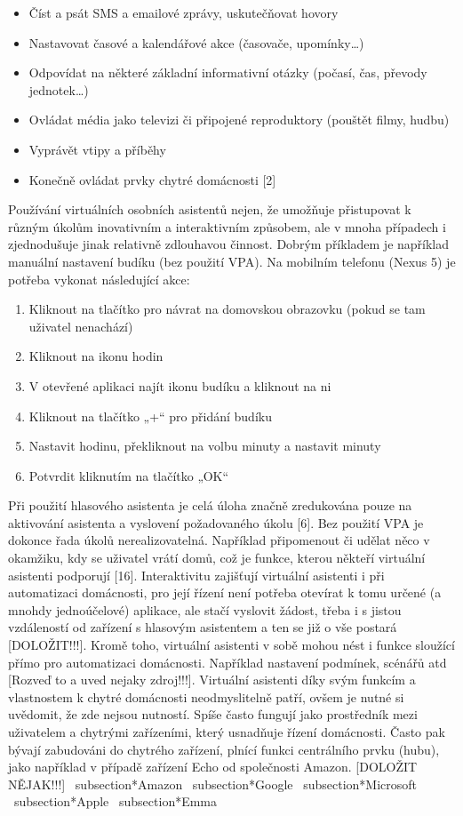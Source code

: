 \begin{itemize}
\item Číst a psát SMS a emailové zprávy, uskutečňovat hovory
\item Nastavovat časové a kalendářové akce (časovače, upomínky…)
\item Odpovídat na některé základní informativní otázky (počasí, čas, převody jednotek…)
\item Ovládat média jako televizi či připojené reproduktory (pouštět filmy, hudbu)
\item Vyprávět vtipy a příběhy
\item Konečně ovládat prvky chytré domácnosti [2]
\end{itemize}
Používání virtuálních osobních asistentů nejen, že umožňuje přistupovat k různým úkolům inovativním a interaktivním způsobem, ale v mnoha případech i zjednodušuje jinak relativně zdlouhavou činnost. Dobrým příkladem je například manuální nastavení budíku (bez použití VPA). Na mobilním telefonu (Nexus 5) je potřeba vykonat následující akce:
\begin{enumerate}
\item Kliknout na tlačítko pro návrat na domovskou obrazovku (pokud se tam uživatel nenachází)
\item Kliknout na ikonu hodin
\item V otevřené aplikaci najít ikonu budíku a kliknout na ni 
\item Kliknout na tlačítko „+“ pro přidání budíku
\item Nastavit hodinu, překliknout na volbu minuty a nastavit minuty
\item Potvrdit kliknutím na tlačítko „OK“
\end{enumerate}
Při použití hlasového asistenta je celá úloha značně zredukována pouze na aktivování asistenta a vyslovení požadovaného úkolu [6]. \newline
Bez použití VPA je dokonce řada úkolů nerealizovatelná. Například připomenout či udělat něco v okamžiku, kdy se uživatel vrátí domů, což je funkce, kterou někteří virtuální asistenti podporují [16]. Interaktivitu zajišťují virtuální asistenti i při automatizaci domácnosti, pro její řízení není potřeba otevírat k tomu určené (a mnohdy jednoúčelové) aplikace, ale stačí vyslovit žádost, třeba i s jistou vzdáleností od zařízení s hlasovým asistentem a ten se již o vše postará [DOLOŽIT!!!]. Kromě toho, virtuální asistenti v sobě mohou nést i funkce sloužící přímo pro automatizaci domácnosti. Například nastavení podmínek, scénářů atd [Rozveď to a uved nejaky zdroj!!!]. \newline
Virtuální asistenti díky svým funkcím a vlastnostem k chytré domácnosti neodmyslitelně patří, ovšem je nutné si uvědomit, že zde nejsou nutností. Spíše často fungují jako prostředník mezi uživatelem a chytrými zařízeními, který usnadňuje řízení domácnosti. Často pak bývají zabudováni do chytrého zařízení, plnící funkci centrálního prvku (hubu), jako například v případě zařízení Echo od společnosti Amazon. [DOLOŽIT NĚJAK!!!] \newline
\ subsection*{Amazon}
\ subsection*{Google}
\ subsection*{Microsoft}
\ subsection*{Apple}
\ subsection*{Emma}

